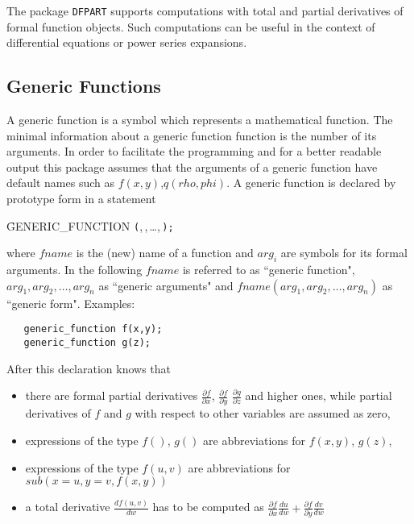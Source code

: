
The package {\tt DFPART} supports computations with total and partial
derivatives of formal function objects. Such computations can
be useful in the context of differential equations or
power series expansions.

\subsection{Generic Functions}

A generic function is a symbol which represents a mathematical
function. The minimal information about a generic function 
function is the number of its arguments. In order to facilitate
the programming and for a better readable output this package
assumes that the arguments of a generic function have default
names such as $f(x,y)$,$q(rho,phi)$. 
A generic function is declared by prototype form in a statement
\begin{syntax}
  \f{GENERIC\_FUNCTION }\texttt{(},\,,\,\dots,\,\texttt{);}
\end{syntax}

\noindent
where $fname$ is the (new) name of a function and $arg_i$ are
symbols for its formal arguments. 
In the following $fname$ is referred to as ``generic function",
$arg_1,arg_2,\dots,arg_n$ as ``generic arguments" and
$fname(arg_1,arg_2,\dots,arg_n)$ as ``generic form".
Examples:

\begin{verbatim}
   generic_function f(x,y);
   generic_function g(z);
\end{verbatim}


After this declaration {\REDUCE} knows that 
\begin{itemize}
\item there are formal partial derivatives $\frac{\partial f}{\partial x}$,
$\frac{\partial f}{\partial y}$ $\frac{\partial g}{\partial z}$
and higher ones, while partial derivatives of $f$ and $g$
with respect to other variables are assumed as zero,
\item expressions of the type $f()$, $g()$ are abbreviations for
$f(x,y)$, $g(z)$,
\item expressions of the type $f(u,v)$ are abbreviations for\\
$sub(x=u,y=v,f(x,y))$
\item a total derivative $\frac{d f(u,v)}{d w}$ has to be computed
as $\frac{\partial f}{\partial x} \frac{d u}{d w} +
    \frac{\partial f}{\partial y} \frac{d v}{d w}$
\end{itemize}

